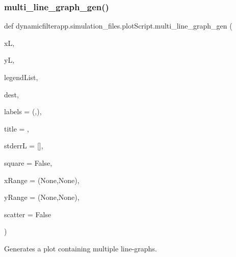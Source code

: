 \subsubsection{\texorpdfstring{multi\_line\_graph\_gen()}{multi\_line\_graph\_gen()}}
{\footnotesize\ttfamily def dynamicfilterapp.\+simulation\+\_\+files.\+plot\+Script.\+multi\+\_\+line\+\_\+graph\+\_\+gen (\begin{DoxyParamCaption}\item[{}]{xL,  }\item[{}]{yL,  }\item[{}]{legend\+List,  }\item[{}]{dest,  }\item[{}]{labels = {\ttfamily (\textquotesingle{}\textquotesingle{},\textquotesingle{}\textquotesingle{})},  }\item[{}]{title = {\ttfamily \textquotesingle{}\textquotesingle{}},  }\item[{}]{stderrL = {\ttfamily \mbox{[}\mbox{]}},  }\item[{}]{square = {\ttfamily False},  }\item[{}]{x\+Range = {\ttfamily (None,None)},  }\item[{}]{y\+Range = {\ttfamily (None,None)},  }\item[{}]{scatter = {\ttfamily False} }\end{DoxyParamCaption})}



Generates a plot containing multiple line-\/graphs. 


